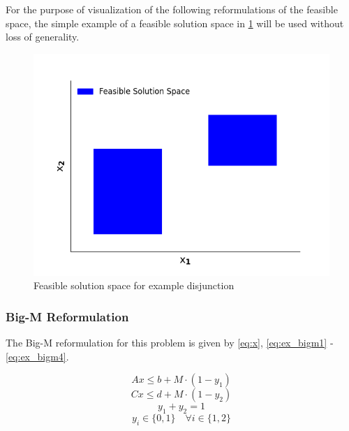 \documentclass{juliacon}
\begin{document}
For the purpose of visualization of the following reformulations of the feasible space, the simple example of a feasible solution space in \ref{fig:reform_figure} will be used without loss of generality.

\begin{figure}[H]
    \centering
    \includegraphics[scale=0.5]{solnspace.png}
    \caption{Feasible solution space for example disjunction}
    \label{fig:reform_figure}
\end{figure}
\vskip 6pt

 \subsubsection{Big-M Reformulation}
 The Big-M reformulation for this problem is given by \eqref{eq:x}, \eqref{eq:ex_bigm1} - \eqref{eq:ex_bigm4}.
 \vskip 6pt
 
\begin{equation}
    \label{eq:ex_bigm1}
    Ax \leq b + M \cdot (1 - y_1)
\end{equation}
\begin{equation}
    \label{eq:ex_bigm2}
    Cx \leq d + M \cdot (1 - y_2)
\end{equation}
\begin{equation}
    \label{eq:ex_bigm3}
    y_1 + y_2 = 1
\end{equation}
\begin{equation}
    \label{eq:ex_bigm4}
    y_i \in \{0,1\} \quad \forall i \in \{1,2\}
\end{equation}
\vskip 6pt
\end{document}
